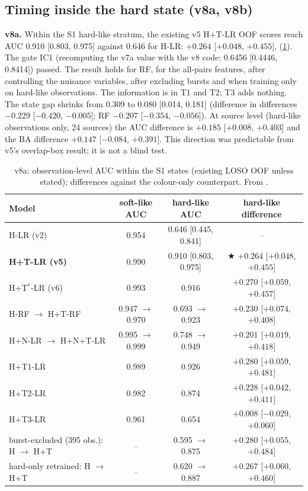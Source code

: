\subsection{Timing inside the hard state (v8a, v8b)}\label{sec:p4v8a}
\Primary{} \textbf{v8a.} Within the S1 hard-like stratum, the existing v5 H+T-LR OOF scores reach AUC 0.910 [0.803, 0.975]
against 0.646 for H-LR: $+0.264$ [$+0.048$, $+0.455$], \Detected{} (\cref{tab:p4v8a}). The gate IC1 (recomputing the v7a
value with the v8 code: 0.6456 [0.4446, 0.8414]) passed. The result holds for RF, for the all-pairs features, after
controlling the nuisance variables, after excluding bursts and when training only on hard-like observations. The
information is in T1 and T2; T3 adds nothing. The state gap shrinks from 0.309 to 0.080 [0.014, 0.181] (difference in
differences $-0.229$ [$-0.420$, $-0.005$]; RF $-0.207$ [$-0.354$, $-0.056$]). At source level (hard-like observations only,
24 sources) the AUC difference is $+0.185$ [$+0.008$, $+0.403$] and the BA difference $+0.147$ [$-0.084$, $+0.391$]. This
direction was predictable from v5's overlap-box result; it is not a blind test.

\begin{table}[htbp]
\centering\small
\caption[Timing in the hard-like state]{v8a: observation-level AUC within the S1 states (existing LOSO OOF unless stated);
differences against the colour-only counterpart. From .}
\label{tab:p4v8a}
\setlength{\tabcolsep}{4pt}
\begin{tabular}{@{}lccc@{}}
\toprule
Model & soft-like AUC & hard-like AUC & hard-like difference \\
\midrule
H-LR (v2) & 0.954 & 0.646 [0.445, 0.841] & -- \\
\textbf{H+T-LR (v5)} & 0.990 & 0.910 [0.803, 0.975] & $\bigstar$ $+0.264$ [$+0.048$, $+0.455$] \\
H+T$^*$-LR (v6) & 0.993 & 0.916 & $+0.270$ [$+0.059$, $+0.457$] \\
H-RF $\to$ H+T-RF & 0.947 $\to$ 0.970 & 0.693 $\to$ 0.923 & $+0.230$ [$+0.074$, $+0.408$] \\
H+N-LR $\to$ H+N+T-LR & 0.995 $\to$ 0.999 & 0.748 $\to$ 0.949 & $+0.201$ [$+0.019$, $+0.418$] \\
H+T1-LR & 0.989 & 0.926 & $+0.280$ [$+0.059$, $+0.481$] \\
H+T2-LR & 0.982 & 0.874 & $+0.228$ [$+0.042$, $+0.411$] \\
H+T3-LR & 0.961 & 0.654 & $+0.008$ [$-0.029$, $+0.060$] \\
burst-excluded (395 obs.): H $\to$ H+T & -- & 0.595 $\to$ 0.875 & $+0.280$ [$+0.055$, $+0.484$] \\
hard-only retrained: H $\to$ H+T & -- & 0.620 $\to$ 0.887 & $+0.267$ [$+0.060$, $+0.460$] \\
\bottomrule
\end{tabular}
\end{table}


